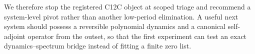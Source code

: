 We therefore stop the registered C12C object at scoped triage and recommend a
system-level pivot rather than another low-period elimination.  A useful next system should
possess a reversible polynomial dynamics and a canonical self-adjoint operator
from the outset, so that the first experiment can test an exact
dynamics--spectrum bridge instead of fitting a finite zero list.
